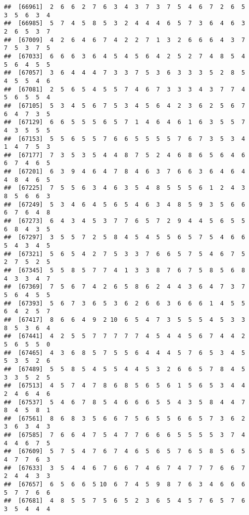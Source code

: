 \documentclass[
]{book}
\begin{document}
\begin{verbatim}
##  [66961]  2  6  6  2  7  6  3  4  3  7  3  7  5  4  6  7  2  6  5  3  5  6  3  4
##  [66985]  5  7  4  5  8  5  3  2  4  4  4  6  5  7  3  6  4  6  3  2  6  5  3  7
##  [67009]  4  2  6  4  6  7  4  2  2  7  1  3  2  6  6  6  4  3  7  7  5  3  7  5
##  [67033]  6  6  6  3  6  4  5  4  5  6  4  2  5  2  7  4  8  5  4  5  6  4  5  5
##  [67057]  3  6  4  4  4  7  3  3  7  5  3  6  3  3  3  5  2  8  5  4  5  5  4  6
##  [67081]  2  5  6  5  4  5  5  7  4  6  7  3  3  3  4  3  7  7  4  5  6  5  5  4
##  [67105]  5  3  4  5  6  7  5  3  4  5  6  4  2  3  6  2  5  6  7  6  4  7  3  5
##  [67129]  6  6  5  5  5  6  5  7  1  4  6  4  6  1  6  3  5  5  7  4  3  5  5  5
##  [67153]  5  5  6  5  5  7  6  6  5  5  5  5  7  6  7  3  5  3  4  1  4  7  5  3
##  [67177]  7  3  5  3  5  4  4  8  7  5  2  4  6  8  6  5  6  4  6  6  7  4  6  5
##  [67201]  6  3  9  4  6  4  7  8  4  6  3  7  6  6  3  6  4  6  4  4  8  4  6  5
##  [67225]  7  5  5  6  3  4  6  3  5  4  8  5  5  5  6  1  2  4  3  8  5  6  6  3
##  [67249]  5  3  4  6  4  5  6  5  4  6  3  4  8  5  9  3  5  6  6  6  7  6  4  8
##  [67273]  6  4  3  4  5  3  7  7  6  5  7  2  9  4  4  5  6  5  5  6  8  4  3  5
##  [67297]  3  5  5  7  2  5  8  4  5  4  5  5  6  5  7  5  4  6  6  5  4  3  4  5
##  [67321]  5  6  5  4  2  7  5  3  3  7  6  6  5  7  5  4  6  7  5  2  7  5  2  5
##  [67345]  5  5  8  5  7  7  4  1  3  3  8  7  6  7  5  8  5  6  8  4  3  3  4  7
##  [67369]  7  5  6  7  4  2  6  5  8  6  2  4  4  3  6  4  7  3  7  5  6  4  5  5
##  [67393]  5  6  7  3  6  5  3  6  2  6  6  3  6  6  6  1  4  5  5  6  4  2  5  7
##  [67417]  8  6  6  4  9  2 10  6  5  4  7  3  5  5  5  4  5  3  3  8  5  3  6  4
##  [67441]  4  2  5  5  7  7  7  7  7  4  5  4  4  5  6  7  4  4  2  5  6  5  5  0
##  [67465]  4  3  6  8  5  7  5  5  6  4  4  4  5  7  6  5  3  4  5  5  3  5  2  6
##  [67489]  5  5  8  5  4  5  5  4  4  5  3  2  6  6  5  7  8  4  5  3  3  5  2  5
##  [67513]  4  5  7  4  7  8  6  8  5  6  5  6  1  5  6  5  3  4  4  2  4  6  4  6
##  [67537]  5  4  6  7  8  5  4  6  6  6  5  5  4  3  5  8  4  4  7  8  4  5  8  1
##  [67561]  8  6  8  3  5  6  6  7  5  6  5  5  6  6  5  7  3  6  2  3  6  3  4  3
##  [67585]  7  6  6  4  7  5  4  7  7  6  6  6  5  5  5  5  3  7  4  4  4  6  7  5
##  [67609]  5  7  5  4  7  6  7  4  6  5  6  5  7  6  5  8  5  6  5  4  7  7  6  3
##  [67633]  3  5  4  4  6  7  6  6  7  4  6  7  4  7  7  7  6  6  7  2  4  4  3  3
##  [67657]  6  5  6  6  5 10  6  7  4  5  9  8  7  6  3  4  6  6  6  5  7  7  6  6
##  [67681]  4  8  5  5  7  5  6  5  2  3  6  5  4  5  7  6  5  7  6  3  5  4  4  4

\end{verbatim}
\end{document}
